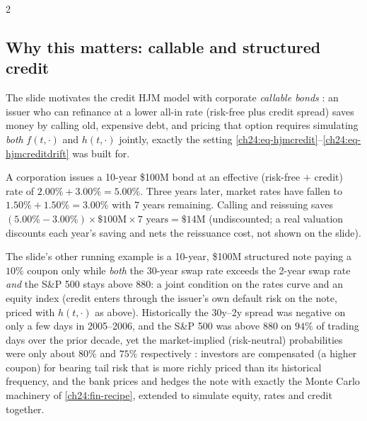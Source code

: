 \begin{paracol}{2}
\subsection{Why this matters: callable and structured credit}
The slide motivates the credit HJM model with corporate \emph{callable bonds} : an issuer who can refinance at a lower all-in rate (risk-free plus credit spread) saves money by calling old, expensive debt, and pricing that option requires simulating \emph{both} $f(t,\cdot)$ and $h(t,\cdot)$ jointly, exactly the setting \eqref{ch24:eq-hjmcredit}--\eqref{ch24:eq-hjmcreditdrift} was built for.
\begin{example}
A corporation issues a 10-year \$100M bond at an effective (risk-free $+$ credit) rate of $2.00\%+3.00\%=5.00\%$. Three years later, market rates have fallen to $1.50\%+1.50\%=3.00\%$ with $7$ years remaining. Calling and reissuing saves $(5.00\%-3.00\%)\times\$100\text{M}\times7\text{ years}=\$14\text{M}$ (undiscounted; a real valuation discounts each year's saving and nets the reissuance cost, not shown on the slide).
\end{example}
\begin{casestudy}
The slide's other running example  is a 10-year, \$100M structured note paying a $10\%$ coupon only while \emph{both} the 30-year swap rate exceeds the 2-year swap rate \emph{and} the S\&P 500 stays above $880$: a joint condition on the rates curve and an equity index (credit enters through the issuer's own default risk on the note, priced with $h(t,\cdot)$ as above). Historically the 30y--2y spread was negative on only a few days in 2005--2006, and the S\&P 500 was above $880$ on $94\%$ of trading days over the prior decade, yet the market-implied (risk-neutral) probabilities were only about $80\%$ and $75\%$ respectively : investors are compensated (a higher coupon) for bearing tail risk that is more richly priced than its historical frequency, and the bank prices and hedges the note with exactly the Monte Carlo machinery of \cref{ch24:fin-recipe}, extended to simulate equity, rates and credit together.
\end{casestudy}


\end{paracol}
